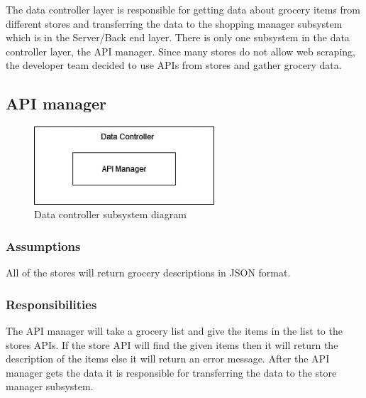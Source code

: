 The data controller layer is responsible for getting data about grocery items from different stores and transferring the data to the shopping manager subsystem which is in the Server/Back end layer. There is only one subsystem in the data controller layer, the API manager. Since many stores do not allow web scraping, the developer team decided to use APIs from stores and gather grocery data.
\subsection{API manager}

\begin{figure}[h!]
	\centering
 	\includegraphics[width=0.60\textwidth]{images/data_controller.jpg}
 \caption{Data controller subsystem diagram}
\end{figure}

\subsubsection{Assumptions}
All of the stores will return grocery descriptions in JSON format. 

\subsubsection{Responsibilities}
The API manager will take a grocery list and give the items in the list to the stores APIs. If the store API will find the given items then it will return the description of the items else it will return an error message. After the API manager gets the data it is responsible for transferring the data to the store manager subsystem. 

